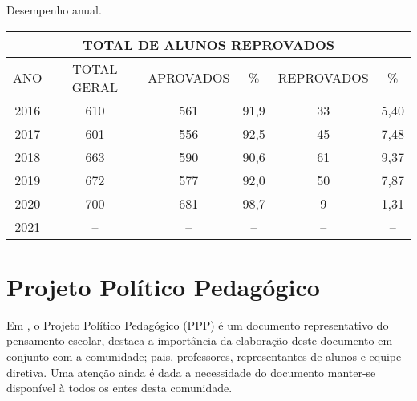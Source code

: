 \begin{quadro}[ht!]
    \centering
    \caption{Desempenho anual.}
    \label{qua:totalReprovacao}
    \begin{tabular}{|cccccc|}
        \hline
        \multicolumn{6}{|c|}{\textbf{TOTAL DE ALUNOS REPROVADOS}}                                                                                     \\ \hline
        \multicolumn{1}{|c|}{ANO} & \multicolumn{1}{c|}{TOTAL GERAL} & \multicolumn{1}{c|}{APROVADOS} & \multicolumn{1}{c|}{\%} & \multicolumn{1}{c|}{REPROVADOS} & \% \\ \hline
        \multicolumn{1}{|c|}{2016} & \multicolumn{1}{c|}{610} & \multicolumn{1}{c|}{561} & \multicolumn{1}{c|}{91,9} & \multicolumn{1}{c|}{33} & 5,40 \\ \hline
        \multicolumn{1}{|c|}{2017} & \multicolumn{1}{c|}{601} & \multicolumn{1}{c|}{556} & \multicolumn{1}{c|}{92,5} & \multicolumn{1}{c|}{45} & 7,48 \\ \hline
        \multicolumn{1}{|c|}{2018} & \multicolumn{1}{c|}{663} & \multicolumn{1}{c|}{590} & \multicolumn{1}{c|}{90,6} & \multicolumn{1}{c|}{61} & 9,37 \\ \hline
        \multicolumn{1}{|c|}{2019} & \multicolumn{1}{c|}{672} & \multicolumn{1}{c|}{577} & \multicolumn{1}{c|}{92,0} & \multicolumn{1}{c|}{50} & 7,87 \\ \hline
        \multicolumn{1}{|c|}{2020} & \multicolumn{1}{c|}{700} & \multicolumn{1}{c|}{681} & \multicolumn{1}{c|}{98,7} & \multicolumn{1}{c|}{9}  & 1,31 \\ \hline
        \multicolumn{1}{|c|}{2021} & \multicolumn{1}{c|}{--}  & \multicolumn{1}{c|}{--}  & \multicolumn{1}{c|}{--}   & \multicolumn{1}{c|}{--} & --   \\ \hline
    \end{tabular}
\end{quadro}
\newpage
\section{Projeto Político Pedagógico}
Em \cite{CARVALHOAMP:2012a}, o Projeto Político Pedagógico (PPP) é um documento representativo do pensamento escolar, destaca a importância da elaboração deste documento em conjunto com a comunidade; pais, professores, representantes de alunos e equipe diretiva. Uma atenção ainda é dada a necessidade do documento manter-se disponível à todos os entes desta comunidade. 

